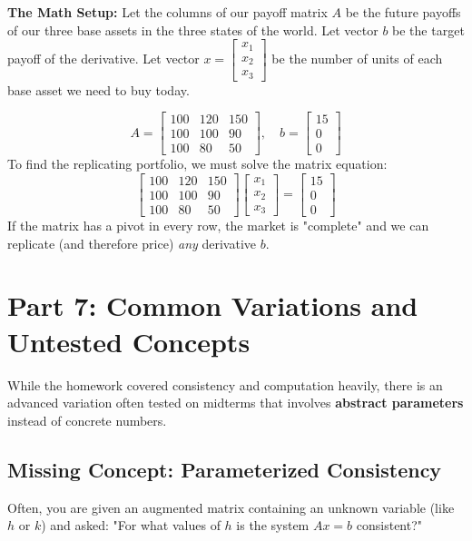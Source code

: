 \documentclass{article}
\begin{document}
\textbf{The Math Setup:}
Let the columns of our payoff matrix $A$ be the future payoffs of our three base assets in the three states of the world. Let vector $b$ be the target payoff of the derivative. Let vector $x = \begin{bmatrix} x_1 \\ x_2 \\ x_3 \end{bmatrix}$ be the number of units of each base asset we need to buy today.

\[ A = \begin{bmatrix} 100 & 120 & 150 \\ 100 & 100 & 90 \\ 100 & 80 & 50 \end{bmatrix}, \quad b = \begin{bmatrix} 15 \\ 0 \\ 0 \end{bmatrix} \]
To find the replicating portfolio, we must solve the matrix equation:
\[ \begin{bmatrix} 100 & 120 & 150 \\ 100 & 100 & 90 \\ 100 & 80 & 50 \end{bmatrix} \begin{bmatrix} x_1 \\ x_2 \\ x_3 \end{bmatrix} = \begin{bmatrix} 15 \\ 0 \\ 0 \end{bmatrix} \]
If the matrix has a pivot in every row, the market is "complete" and we can replicate (and therefore price) \textit{any} derivative $b$.

\newpage
\section{Part 7: Common Variations and Untested Concepts}

While the homework covered consistency and computation heavily, there is an advanced variation often tested on midterms that involves \textbf{abstract parameters} instead of concrete numbers.

\subsection{Missing Concept: Parameterized Consistency}
Often, you are given an augmented matrix containing an unknown variable (like $h$ or $k$) and asked: "For what values of $h$ is the system $Ax = b$ consistent?"
\end{document}
